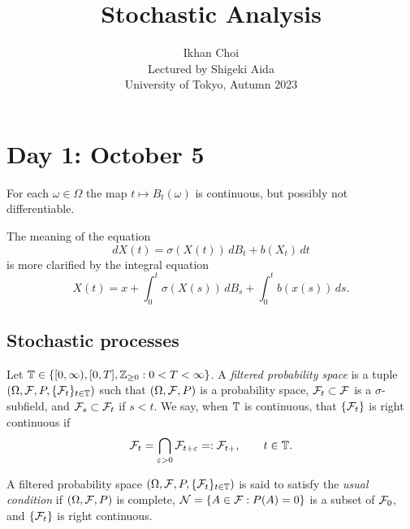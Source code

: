 \documentclass{../../../small}
\begin{document}
\title{Stochastic Analysis}
\author{Ikhan Choi\\Lectured by Shigeki Aida\\University of Tokyo, Autumn 2023}
\maketitle
\tableofcontents

\newpage
\section{Day 1: October 5}

For each $\omega\in\Omega$ the map $t\mapsto B_t(\omega)$ is continuous, but possibly not differentiable.

The meaning of the equation
\[dX(t)=\sigma(X(t))\,dB_t+b(X_t)\,dt\]
is more clarified by the integral equation
\[X(t)=x+\int_0^t\sigma(X(s))\,dB_s+\int_0^tb(x(s))\,ds.\]

\subsection*{Stochastic processes}
\begin{defn}
Let $\mathbb{T}\in\{[0,\infty),[0,T],\mathbb{Z}_{\ge0}:0<T<\infty\}$.
A \emph{filtered probability space} is a tuple $(\Omega,\mathcal{F},P,\{\mathcal{F}_t\}_{t\in\mathbb{T}})$ such that $(\Omega,\mathcal{F},P)$ is a probability space, $\mathcal{F}_t\subset\mathcal{F}$ is a $\sigma$-subfield, and $\mathcal{F}_s\subset\mathcal{F}_t$ if $s<t$.
We say, when $\mathbb{T}$ is continuous, that $\{\mathcal{F}_t\}$ is right continuous if
\[\mathcal{F}_t=\bigcap_{\varepsilon>0}\mathcal{F}_{t+\varepsilon}=:\mathcal{F}_{t+},\qquad t\in\mathbb{T}.\]
\end{defn}

\begin{defn}
A filtered probability space $(\Omega,\mathcal{F},P,\{\mathcal{F}_t\}_{t\in\mathbb{T}})$ is said to satisfy the \emph{usual condition} if $(\Omega,\mathcal{F},P)$ is complete, $\mathcal{N}=\{A\in\mathcal{F}:P(A)=0\}$ is a subset of $\mathcal{F}_0$, and $\{\mathcal{F}_t\}$ is right continuous.
\end{defn}
\end{document}
